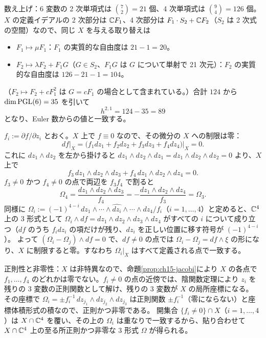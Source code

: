 数え上げ：6 変数の 2 次単項式は $\binom{7}{2} = 21$ 個、4 次単項式は $\binom{9}{4} = 126$ 個。$X$ の定義イデアルの 2 次部分は $\mathbb{C} F_1$、4 次部分は $F_1\cdot S_2 + \mathbb{C} F_2$（$S_2$ は 2 次式の空間）なので、同じ $X$ を与える取り替えは
\begin{itemize}
\item $F_1\mapsto\mu F_1$：$F_1$ の実質的な自由度は $21-1 = 20$。
\item $F_2\mapsto\lambda F_2 + F_1G$（$G\in S_2$、$F_1G$ は $G$ について単射で 21 次元）：$F_2$ の実質的な自由度は $126 - 21 - 1 = 104$。
\end{itemize}
（$F_2\mapsto F_2 + cF_1^2$ は $G = cF_1$ の場合として含まれている。）合計 $124$ から $\dim\operatorname{PGL}(6) = 35$ を引いて
\[
h^{2,1} = 124 - 35 = 89
\]
となり、Euler 数からの値と一致する。

$f_i := \partial f/\partial z_i$ とおく。$X$ 上で $f\equiv 0$ なので、その微分の $X$ への制限は零：
\[
df|_X = \big(f_1dz_1 + f_2dz_2 + f_3dz_3 + f_4dz_4\big)\big|_X = 0 .
\]
これに $dz_1\wedge dz_2$ を左から掛けると $dz_1\wedge dz_2\wedge dz_1 = dz_1\wedge dz_2\wedge dz_2 = 0$ より、$X$ 上で
\[
f_3\,dz_1\wedge dz_2\wedge dz_3 + f_4\,dz_1\wedge dz_2\wedge dz_4 = 0 .
\]
$f_3\ne0$ かつ $f_4\neq0$ の点で両辺を $f_3f_4$ で割ると
\[
\Omega_4 = \frac{dz_1\wedge dz_2\wedge dz_3}{f_4} = -\frac{dz_1\wedge dz_2\wedge dz_4}{f_3} = \Omega_3 .
\]
同様に $\Omega_i := (-1)^{4-i}\,dz_1\wedge\cdots\wedge\widehat{dz_i}\wedge\cdots\wedge dz_4/f_i$（$i = 1,\dots,4$）と定めると、$\mathbb{C}^4$ 上の 3 形式として $\Omega_i\wedge df = dz_1\wedge dz_2\wedge dz_3\wedge dz_4$ がすべての $i$ について成り立つ（$df$ のうち $f_idz_i$ の項だけが残り、$dz_i$ を正しい位置に移す符号が $(-1)^{4-i}$）。
よって $(\Omega_i - \Omega_j)\wedge df = 0$ で、$df\neq0$ の点では $\Omega_i-\Omega_j = df\wedge\xi$ の形になり、$X$ に制限すると零。すなわち $\Omega_i|_X$ はすべて定義される点で一致する。

正則性と非零性：$X$ は非特異なので、命題\ref{prop:ch15-jacobi}により $X$ の各点で $f_1,\dots,f_4$ のどれかは零でない。$f_i\neq0$ の点の近傍では、陰関数定理により $z_i$ を残りの 3 変数の正則関数として解け、残りの 3 変数が $X$ の局所座標になる。
その座標で $\Omega_i = \pm f_i^{-1}\,dz_{j_1}\wedge dz_{j_2}\wedge dz_{j_3}$ は正則関数 $\pm f_i^{-1}$（零にならない）と座標体積形式の積なので、正則かつ非零である。
開集合 $\{f_i\neq0\}\cap X$（$i = 1,\dots,4$）は $X\cap\mathbb{C}^4$ を覆い、その上の $\Omega_i$ は重なりで一致するから、貼り合わせて $X\cap\mathbb{C}^4$ 上の至る所正則かつ非零な 3 形式 $\Omega$ が得られる。

